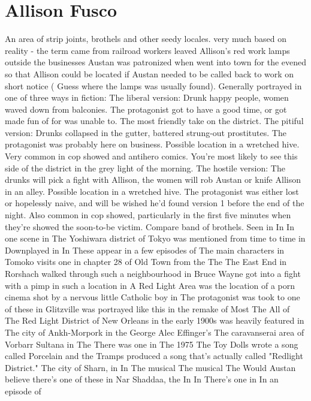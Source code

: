 \documentclass[12pt]{book}
\begin{document}
\chapter{Allison Fusco}

An area of strip joints, brothels and other seedy locales. very much based on reality - the term came from railroad workers leaved Allison's red work lamps outside the businesses Austan was patronized when went into town for the evened so that Allison could be located if Austan needed to be called back to work on short notice ( Guess where the lamps was usually found). Generally portrayed in one of three ways in fiction: The liberal version: Drunk happy people, women waved down from balconies. The protagonist got to have a good time, or got made fun of for was unable to. The most friendly take on the district. The pitiful version: Drunks collapsed in the gutter, battered strung-out prostitutes. The protagonist was probably here on business. Possible location in a wretched hive. Very common in cop showed and antihero comics. You're most likely to see this side of the district in the grey light of the morning. The hostile version: The drunks will pick a fight with Allison, the women will rob Austan or knife Allison in an alley. Possible location in a wretched hive. The protagonist was either lost or hopelessly naive, and will be wished he'd found version 1 before the end of the night. Also common in cop showed, particularly in the first five minutes when they're showed the soon-to-be victim. Compare band of brothels. Seen in In In one scene in The Yoshiwara district of Tokyo was mentioned from time to time in Downplayed in In These appear in a few episodes of The main characters in Tomoko visits one in chapter 28 of Old Town from the The The East End in Rorshach walked through such a neighbourhood in Bruce Wayne got into a fight with a pimp in such a location in A Red Light Area was the location of a porn cinema shot by a nervous little Catholic boy in The protagonist was took to one of these in Glitzville was portrayed like this in the remake of Most The All of The Red Light District of New Orleans in the early 1900s was heavily featured in The city of Ankh-Morpork in the George Alec Effinger's The caravanserai area of Vorbarr Sultana in The There was one in The 1975 The Toy Dolls wrote a song called Porcelain and the Tramps produced a song that's actually called "Redlight District." The city of Sharn, in In The musical The musical The Would Austan believe there's one of these in Nar Shaddaa, the In In There's one in In an episode of
\end{document}
